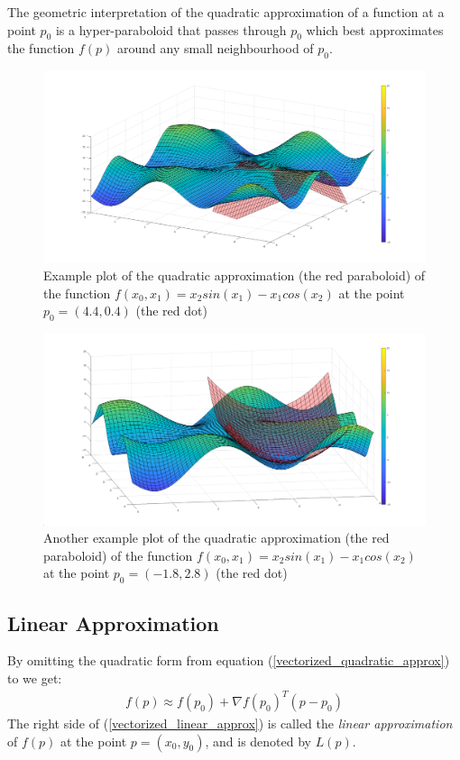 \noindent The geometric interpretation of the quadratic approximation of a function at a point $p_0$ is a hyper-paraboloid that passes through $p_0$ which best approximates the function $f(p)$ around any small neighbourhood of $p_0$.
\begin{figure}[ht]
\centering
\includegraphics[width=13cm]{figures/quad_approx1}
\caption[Quadratic approximation example 1]{Example plot of the quadratic approximation (the red paraboloid) of the function $f\left(x_0, x_1\right) = x_2sin\left(x_1\right) - x_1cos\left(x_2\right)$ at the point $p_0 = \left(4.4, 0.4\right)$ (the red dot)}
\label{fig:quad_approx1}
\end{figure}
\begin{figure}[ht]
\centering
\includegraphics[width=13cm]{figures/quad_approx2}
\caption[Quadratic approximation example 2]{Another example plot of the quadratic approximation (the red paraboloid) of the function $f\left(x_0, x_1\right) = x_2sin\left(x_1\right) - x_1cos\left(x_2\right)$ at the point $p_0 = \left(-1.8, 2.8\right)$ (the red dot)}
\label{fig:quad_approx2}
\end{figure}
\subsection{Linear Approximation}
By omitting the quadratic form from equation (\ref{vectorized_quadratic_approx}) to we get:
\begin{equation}\label{vectorized_linear_approx}
\begin{split}
f\left(p\right) \approx f\left(p_0\right) + \nabla f\left(p_0\right)^T\left(p-p_0\right)
\end{split}
\end{equation}
\noindent The right side of (\ref{vectorized_linear_approx}) is called the \emph{linear approximation} of $f(p)$ at the point $p=(x_0, y_0)$, and is denoted by $L(p)$.

